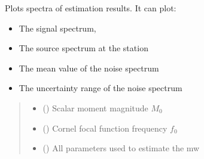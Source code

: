 \documentclass[letterpaper,10pt,english]{sphinxmanual}
\begin{document}
\begin{fulllineitems}
\begin{fulllineitems}
\begin{quote}
\begin{description}
\end{description}\end{quote}

\end{fulllineitems}


\begin{fulllineitems}
\label{\detokenize{api_support:amw.mw.plot.PlotMw.plot_results}}
\pysigstartsignatures
{}
\pysigstopsignatures
\sphinxAtStartPar
Plots spectra of estimation results. It can plot:
\begin{itemize}
\item {} 
\sphinxAtStartPar
The signal spectrum,

\item {} 
\sphinxAtStartPar
The source spectrum at the station

\item {} 
\sphinxAtStartPar
The mean value of the noise spectrum

\item {} 
\sphinxAtStartPar
The uncertainty range of the noise spectrum

\end{itemize}
\begin{quote}\begin{description}
\begin{itemize}
\item {} 
\sphinxAtStartPar
{} () \textendash{} Scalar moment magnitude \(M_0\)

\item {} 
\sphinxAtStartPar
{} () \textendash{} Cornel focal function frequency \(f_0\)

\item {} 
\sphinxAtStartPar
{} ({\hyperref[\detokenize{api_support:amw.mw.parameters.MwFunctionParameters}]{}}) \textendash{} All parameters used to estimate the mw


\end{itemize}
\end{description}
\end{quote}
\end{fulllineitems}
\end{fulllineitems}
\end{document}
